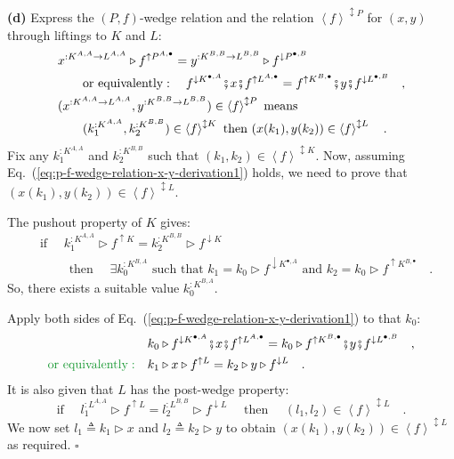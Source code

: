 \textbf{(d)} Express the $\left(P,f\right)$-wedge relation and the
relation $\left<f\right>^{\updownarrow P}$ for $(x,y)$ through liftings
to $K$ and $L$:
\begin{align}
 & x^{:K^{A,A}\rightarrow L^{A,A}}\triangleright f^{\uparrow P^{A,\bullet}}=y^{:K^{B,B}\rightarrow L^{B,B}}\triangleright f^{\downarrow P^{\bullet,B}}\nonumber \\
 & \quad\quad\text{or equivalently}:\quad f^{\downarrow K^{\bullet,A}}\bef x\bef f^{\uparrow L^{A,\bullet}}=f^{\uparrow K^{B,\bullet}}\bef y\bef f^{\downarrow L^{\bullet,B}}\quad,\label{eq:p-f-wedge-relation-x-y-derivation1}\\
 & (x^{:K^{A,A}\rightarrow L^{A,A}},y^{:K^{B,B}\rightarrow L^{B,B}})\in\left<f\right>^{\updownarrow P}\text{ means }\nonumber \\
 & \quad\quad(k_{1}^{:K^{A,A}},k_{2}^{:K^{B,B}})\in\left<f\right>^{\updownarrow K}\text{ then }(x(k_{1}),y(k_{2}))\in\left<f\right>^{\updownarrow L}\quad.\nonumber 
\end{align}
Fix any $k_{1}^{:K^{A,A}}$ and $k_{2}^{:K^{B,B}}$ such that $(k_{1},k_{2})\in\left<f\right>^{\updownarrow K}$.
Now, assuming Eq.~(\ref{eq:p-f-wedge-relation-x-y-derivation1})
holds, we need to prove that $(x(k_{1}),y(k_{2}))\in\left<f\right>^{\updownarrow L}$.

The pushout property of $K$ gives:
\begin{align*}
 & \text{if }\quad k_{1}^{:K^{A,A}}\triangleright f^{\uparrow K}=k_{2}^{:K^{B,B}}\triangleright f^{\downarrow K}\\
 & \quad\quad\text{ then }\quad\exists k_{0}^{:K^{B,A}}\text{ such that }k_{1}=k_{0}\triangleright f^{\downarrow K^{\bullet,A}}\text{ and }k_{2}=k_{0}\triangleright f^{\uparrow K^{B,\bullet}}\quad.
\end{align*}
So, there exists a suitable value $k_{0}^{:K^{B,A}}$.%
\begin{comment}
By Statement~\ref{subsec:Statement-wedge-law-from-parametricity}(a),
the values $k_{1}$, $k_{2}$ are in the $\left(P,f\right)$-wedge
relation: $k_{1}\triangleright f^{\uparrow K}=k_{2}\triangleright f^{\downarrow K}$.
\end{comment}
{} Apply both sides of Eq.~(\ref{eq:p-f-wedge-relation-x-y-derivation1})
to that $k_{0}$:
\begin{align*}
 & k_{0}\triangleright f^{\downarrow K^{\bullet,A}}\bef x\bef f^{\uparrow L^{A,\bullet}}=k_{0}\triangleright f^{\uparrow K^{B,\bullet}}\bef y\bef f^{\downarrow L^{\bullet,B}}\quad,\\
{\color{greenunder}\text{or equivalently}:}\quad & k_{1}\triangleright x\triangleright f^{\uparrow L}=k_{2}\triangleright y\triangleright f^{\downarrow L}\quad.
\end{align*}
 It is also given that $L$ has the post-wedge property:
\[
\text{if }\quad l_{1}^{:L^{A,A}}\triangleright f^{\uparrow L}=l_{2}^{:L^{B,B}}\triangleright f^{\downarrow L}\quad\text{ then }\quad(l_{1},l_{2})\in\left<f\right>^{\updownarrow L}\quad.
\]
We now set $l_{1}\triangleq k_{1}\triangleright x$ and $l_{2}\triangleq k_{2}\triangleright y$
to obtain $(x(k_{1}),y(k_{2}))\in\left<f\right>^{\updownarrow L}$
as required. $\square$

